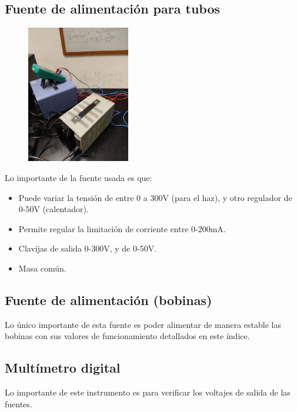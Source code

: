 \documentclass[a4paper]{article}
\begin{document}
    \newpage
    \noindent
    \thispagestyle{fancy}

    \subsection{Fuente de alimentación para tubos}

        \begin{figure}[h!]
            \centering
            \includegraphics[width = 4.5cm] {../imagenes/fuentes.jpg}
        \end{figure}

        \indent Lo importante de la fuente usada es que:
        \begin{itemize}
            \item Puede variar la tensión de entre 0 a 300V (para el haz), y otro regulador de 0-50V (calentador).
            \item Permite regular la limitación de corriente entre 0-200mA.
            \item Clavijas de salida 0-300V, y de 0-50V.
            \item Masa común.
        \end{itemize}

    \subsection{Fuente de alimentación (bobinas)} 
    
        \indent Lo único importante de esta fuente es poder alimentar de manera estable las bobinas con sus valores de funcionamiento detallados en este índice.
       
    \subsection{Multímetro digital}

        \indent Lo importante de este instrumento es para verificar los voltajes de salida de las fuentes.
\end{document}
